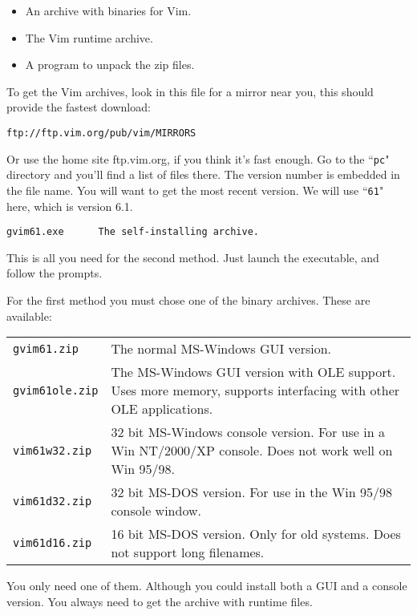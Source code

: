 \begin{itemize}
    \item An archive with binaries for Vim.
    \item The Vim runtime archive.
    \item A program to unpack the zip files.
\end{itemize}

To get the Vim archives, look in this file for a mirror near you, this should provide the fastest download:

\begin{Verbatim}[samepage=true]
    ftp://ftp.vim.org/pub/vim/MIRRORS 
\end{Verbatim}

Or use the home site ftp.vim.org, if you think it's fast enough.
Go to the ``\texttt{pc}" directory and you'll find a list of files there.
The version number is embedded in the file name.
You will want to get the most recent version.
We will use ``\texttt{61}" here, which is version 6.1.

\begin{Verbatim}[samepage=true]
    gvim61.exe      The self-installing archive.
\end{Verbatim}

This is all you need for the second method.
Just launch the executable, and follow the prompts.

For the first method you must chose one of the binary archives.
These are available:

\begin{center} \begin{tabularx}{\textwidth}{l X}
				\texttt{gvim61.zip} & The normal MS-Windows GUI version. \\
				\texttt{gvim61ole.zip} & The MS-Windows GUI version with OLE support.  Uses more memory, supports interfacing with other OLE applications. \\
				\texttt{vim61w32.zip} & 32 bit MS-Windows console version.  For use in a Win NT/2000/XP console.  Does not work well on Win 95/98. \\
				\texttt{vim61d32.zip} & 32 bit MS-DOS version.  For use in the Win 95/98 console window. \\
				\texttt{vim61d16.zip} & 16 bit MS-DOS version.  Only for old systems.  Does not support long filenames. \\
\end{tabularx} \end{center}

You only need one of them.
Although you could install both a GUI and a console version.
You always need to get the archive with runtime files.

